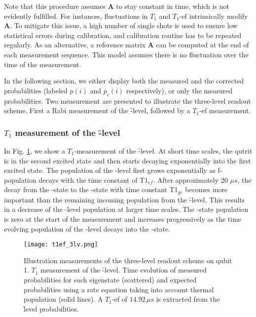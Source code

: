 Note that this procedure assumes $\mathbf{A}$ to stay constant in time, which is not evidently fulfilled. For instances, fluctuations in $T_1$ and $T_1$-ef intrinsically modify $\mathbf{A}$. To mitigate this issue, a high number of single shots is used to ensure low statistical errors during calibration, and calibration routine has to be repeated regularly. As an alternative, a reference matrix $\mathbf{A}$ can be computed at the end of each measurement sequence. This model assumes there is no fluctuation over the time of the measurement.

In the following section, we either display both the measured and the corrected probabilities (labeled $p(i)$ and $p_c(i)$ respectively), or only the measured probabilities. Two measurement are presented to illustrate the three-level readout scheme. First a Rabi measurement of the \f-level, followed by a $T_1$-ef measurement.


\subsubsection{$T_1$ measurement of the \f-level}
In Fig. \ref{fig:t1ef_3lv}, we show a $T_1$-measurement of the \f-level. At short time scales, the qutrit is in the second excited state and then starts decaying exponentially into the first excited state. The population of the \e-level first grows exponentially as f-population decays with the time constant of T1$_{ef}$. After approximately 20 $\mu s$, the decay from the \e-state to the \g-state with time constant T1$_{ge}$ becomes more important than the remaining incoming population from the \f-level.  This results in a decrease of the \e-level population at larger time scales. The \g-state population is zero at the start of the measurement and increases progressively as the time evolving population of the \e-level decays into the \g-state. 

\begin{figure}[H]
  \centering

     \texttt{[image: t1ef\_3lv.png]}
     \label{fig:t1ef_3lv}
\caption{Illustration measurements of the three-level readout scheme on qubit 1.  $T_1$ measurement of the \f-level. Time evolution of measured probabilities for each eigenstate (scattered) and expected probabilities using a rate equation taking into account thermal population (solid lines). A $T_1$-ef of $14.92\, \mu s$ is extracted from the \f level probabilities.}
\end{figure}

